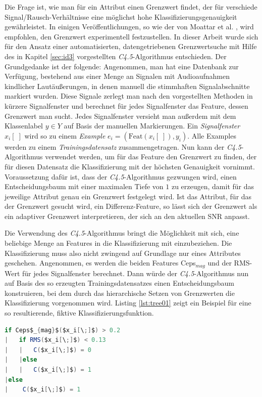 Die Frage ist, wie man für ein Attribut einen Grenzwert findet, der für verschiede Signal/Rausch-Verhältnisse eine möglichst hohe Klassifizierungsgenauigkeit gewährleistet. In einigen Veröffentlichungen, so wie der von Moattar et al. \cite{vad_Easy}, wird empfohlen, den Grenzwert experimentell festzustellen. In dieser Arbeit wurde sich für den Ansatz einer automatisierten, datengetriebenen Grenzwertsuche mit Hilfe des in Kapitel \ref{sec:id3} vorgestellten \emph{C4.5}-Algorithmus entschieden. Der Grundgedanke ist der folgende: Angenommen, man hat eine Datenbank zur Verfügung, bestehend aus einer Menge an Signalen mit Audioaufnahmen kindlicher Lautäußerungen, in denen manuell die stimmhaften Signalabschnitte markiert wurden. Diese Signale zerlegt man nach den vorgestellten Methoden in kürzere Signalfenster und berechnet für jedes Signalfenster das Feature, dessen Grenzwert man sucht. Jedes Signalfenster versieht man außerdem mit dem Klassenlabel $y \in Y$ auf Basis der manuellen Markierungen. Ein \emph{Signalfenster} $x_i[\;]$ wird so zu einem \emph{Example} $e_i = (\text{Feat}(x_i[\;]), y_i)$. Alle Examples werden zu einem \emph{Trainingsdatensatz} zusammengetragen. Nun kann der \emph{C4.5}-Algorithmus verwendet werden, um für das Feature den Grenzwert zu finden, der für diesen Datensatz die Klassifizierung mit der höchsten Genauigkeit vornimmt. Voraussetzung dafür ist, dass der \emph{C4.5}-Algorithmus gezwungen wird, einen Entscheidungsbaum mit einer maximalen Tiefe von $1$ zu erzeugen, damit für das jeweilige Attribut genau ein Grenzwert festgelegt wird. Ist das Attribut, für das der Grenzwert gesucht wird, ein Differenz-Feature, so lässt sich der Grenzwert als ein adaptiver Grenzwert interpretieren, der sich an den aktuellen SNR anpasst.

Die Verwendung des \emph{C4.5}-Algorithmus bringt die Möglichkeit mit sich, eine beliebige Menge an Features in die Klassifizierung mit einzubeziehen. Die Klassifizierung muss also nicht zwingend auf Grundlage nur eines Attributes geschehen. Angenommen, es werden die beiden Features Ceps$_{mag}$ und der RMS-Wert für jedes Signalfenster berechnet. Dann würde der \emph{C4.5}-Algorithmus nun auf Basis des so erzeugten Trainingsdatensatzes einen Entscheidungsbaum konstruieren, bei dem durch das hierarchische Setzen von Grenzwerten die Klassifizierung vorgenommen wird. Listing \ref{lst:tree01} zeigt ein Beispiel für eine so resultierende, fiktive Klassifizierungsfunktion.

\begin{lstlisting}[frame=single,mathescape=true,basicstyle=\footnotesize,language=Java,label=lst:tree01,caption=Beispiel eines CART-Entscheidungsbaums,linewidth=1\textwidth]
if Ceps$_{mag}$($x_i[\;]$) > 0.2
|   if RMS($x_i[\;]$) < 0.13
|   |   C($x_i[\;]$) = 0
|   |else
|   |   C($x_i[\;]$) = 1
|else
|    C($x_i[\;]$) = 1
\end{lstlisting}

